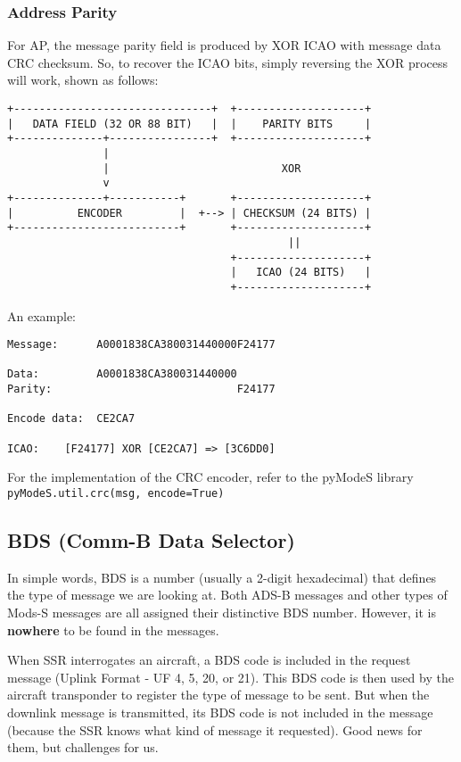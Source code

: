 \subsubsection{Address Parity}\label{address-parity}

For AP, the message parity field is produced by XOR ICAO with message
data CRC checksum. So, to recover the ICAO bits, simply reversing the
XOR process will work, shown as follows:

\begin{verbatim}
+-------------------------------+  +--------------------+
|   DATA FIELD (32 OR 88 BIT)   |  |    PARITY BITS     |
+--------------+----------------+  +--------------------+
               |
               |                           XOR
               v
+--------------+-----------+       +--------------------+
|          ENCODER         |  +--> | CHECKSUM (24 BITS) |
+--------------------------+       +--------------------+
                                            ||
                                   +--------------------+
                                   |   ICAO (24 BITS)   |
                                   +--------------------+
\end{verbatim}

An example:

\begin{verbatim}
Message:      A0001838CA380031440000F24177

Data:         A0001838CA380031440000
Parity:                             F24177

Encode data:  CE2CA7

ICAO:    [F24177] XOR [CE2CA7] => [3C6DD0]
\end{verbatim}

For the implementation of the CRC encoder, refer to the pyModeS library
\texttt{pyModeS.util.crc(msg,\ encode=True)}

\subsection{BDS (Comm-B Data Selector)}\label{bds-comm-b-data-selector}

In simple words, BDS is a number (usually a 2-digit hexadecimal) that
defines the type of message we are looking at. Both ADS-B messages and
other types of Mods-S messages are all assigned their distinctive BDS
number. However, it is \textbf{nowhere} to be found in the messages.

When SSR interrogates an aircraft, a BDS code is included in the request
message (Uplink Format - UF 4, 5, 20, or 21). This BDS code is then used
by the aircraft transponder to register the type of message to be sent.
But when the downlink message is transmitted, its BDS code is not
included in the message (because the SSR knows what kind of message it
requested). Good news for them, but challenges for us.

